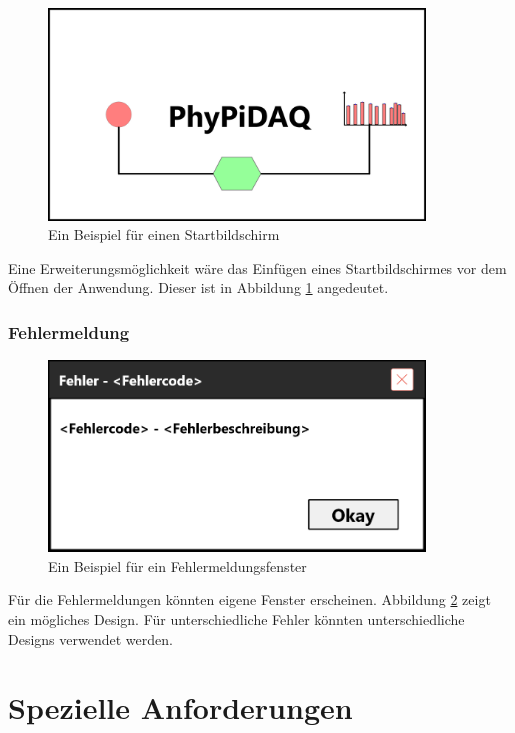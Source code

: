 \documentclass[parskip=full]{scrartcl}
\begin{document}
\begin{figure}[h]
	\begin{center}
		\includegraphics[width = 10cm]{Grafik/Startbildschirm.png}
		\caption{Ein Beispiel für einen Startbildschirm}
		\label{startbildschirm}
	\end{center}
\end{figure}

Eine Erweiterungsmöglichkeit wäre das Einfügen eines Startbildschirmes vor dem Öffnen der Anwendung. Dieser ist in Abbildung \ref{startbildschirm} angedeutet.

\subsubsection{Fehlermeldung}

\begin{figure}[h]
	\begin{center}
		\includegraphics[width = 10cm]{Grafik/Fehlerfenster}
		\caption{Ein Beispiel für ein Fehlermeldungsfenster}
		\label{fehlerfenster}
	\end{center}
\end{figure}

Für die Fehlermeldungen könnten eigene Fenster erscheinen. Abbildung \ref{fehlerfenster} zeigt ein mögliches Design. Für unterschiedliche Fehler könnten unterschiedliche Designs verwendet werden.

\clearpage
\section{Spezielle Anforderungen}\label{entwicklungsumgebung}
\end{document}
